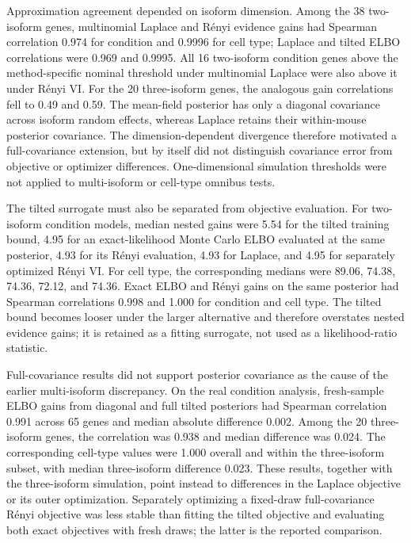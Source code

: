 \documentclass[11pt]{article}
\begin{document}
Approximation agreement depended on isoform dimension. Among the 38 two-isoform genes, multinomial Laplace and R\'enyi evidence gains had Spearman correlation 0.974 for condition and 0.9996 for cell type; Laplace and tilted ELBO correlations were 0.969 and 0.9995. All 16 two-isoform condition genes above the method-specific nominal threshold under multinomial Laplace were also above it under R\'enyi VI. For the 20 three-isoform genes, the analogous gain correlations fell to 0.49 and 0.59. The mean-field posterior has only a diagonal covariance across isoform random effects, whereas Laplace retains their within-mouse posterior covariance. The dimension-dependent divergence therefore motivated a full-covariance extension, but by itself did not distinguish covariance error from objective or optimizer differences. One-dimensional simulation thresholds were not applied to multi-isoform or cell-type omnibus tests.

The tilted surrogate must also be separated from objective evaluation. For two-isoform condition models, median nested gains were 5.54 for the tilted training bound, 4.95 for an exact-likelihood Monte Carlo ELBO evaluated at the same posterior, 4.93 for its R\'enyi evaluation, 4.93 for Laplace, and 4.95 for separately optimized R\'enyi VI. For cell type, the corresponding medians were 89.06, 74.38, 74.36, 72.12, and 74.36. Exact ELBO and R\'enyi gains on the same posterior had Spearman correlations 0.998 and 1.000 for condition and cell type. The tilted bound becomes looser under the larger alternative and therefore overstates nested evidence gains; it is retained as a fitting surrogate, not used as a likelihood-ratio statistic.

Full-covariance results did not support posterior covariance as the cause of the earlier multi-isoform discrepancy. On the real condition analysis, fresh-sample ELBO gains from diagonal and full tilted posteriors had Spearman correlation 0.991 across 65 genes and median absolute difference 0.002. Among the 20 three-isoform genes, the correlation was 0.938 and median difference was 0.024. The corresponding cell-type values were 1.000 overall and within the three-isoform subset, with median three-isoform difference 0.023. These results, together with the three-isoform simulation, point instead to differences in the Laplace objective or its outer optimization. Separately optimizing a fixed-draw full-covariance R\'enyi objective was less stable than fitting the tilted objective and evaluating both exact objectives with fresh draws; the latter is the reported comparison.
\end{document}
